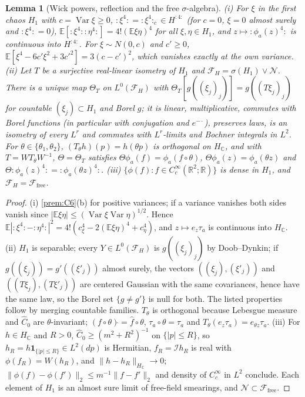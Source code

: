 \documentclass[11pt]{article}
\theoremstyle{plain}
\newtheorem{lemma}[theorem]{Lemma}
\theoremstyle{definition}
\theoremstyle{remark}
\newcommand{\R}{\mathbb{R}}
\newcommand{\C}{\mathbb{C}}
\newcommand{\E}{\mathbb{E}}
\newcommand{\cF}{\mathcal{F}}
\newcommand{\cI}{\mathcal{I}}
\newcommand{\cN}{\mathcal{N}}
\newcommand{\ind}{\mathbf{1}}
\DeclareMathOperator{\Var}{Var}
\begin{document}
\begin{lemma}[Wick powers, reflection and the free $\sigma$-algebra]\label{lem:W-prelim}
(i) For $\xi$ in the first chaos $H_1$ with $c=\Var\xi\ge0$, ${:}\xi^{4}{:}={:}\xi^{4}{:}_c\in H^{{:}4{:}}$ (for $c=0$,
$\xi=0$ almost surely and ${:}\xi^{4}{:}=0$), $\E[{:}\xi^{4}{:}{:}\eta^{4}{:}]=4!(\E\xi\eta)^{4}$ for all $\xi,\eta\in H_1$, and
$z\mapsto{:}\phi_a(z)^{4}{:}$ is continuous into $H^{{:}4{:}}$. For $\xi\sim N(0,c)$ and $c'\ge0$,
$\E[\xi^{4}-6c'\xi^{2}+3c'^{2}]=3(c-c')^{2}$, which vanishes exactly at the own variance.
(ii) Let $T$ be a surjective real-linear isometry of $H_1$ and $\cF_H=\sigma(H_1)\vee\cN$. There is a
unique map $\Theta_T$ on $L^{0}(\cF_H)$ with $\Theta_T[g((\xi_j)_j)]=g((T\xi_j)_j)$ for countable $(\xi_j)\subset H_1$ and
Borel $g$; it is linear, multiplicative, commutes with Borel functions (in
particular with conjugation and $e^{-\cdot}$), preserves laws, is an isometry of every
$L^{r}$ and commutes with $L^{r}$-limits and Bochner integrals in $L^{2}$. For
$\theta\in\{\theta_1,\theta_2\}$, $(T_\theta h)(p)=h(\theta p)$ is orthogonal on $H_\C$, and with $T=WT_\theta W^{-1}$,
$\Theta=\Theta_T$ satisfies $\Theta\phi_a(f)=\phi_a(f\circ\theta)$, $\Theta\phi_a(z)=\phi_a(\theta z)$ and
$\Theta{:}\phi_a(z)^{4}{:}={:}\phi_a(\theta z)^{4}{:}$.
(iii) $\{\phi(f):f\in C_c^{\infty}(\R^{2};\R)\}$ is dense in $H_1$, and $\cF_H=\cF_{\mathrm{free}}$.
\end{lemma}

\begin{proof}
(i) \ref{prem:C6}(b) for positive variances; if a variance vanishes both sides vanish
since $|\E\xi\eta|\le(\Var\xi\Var\eta)^{1/2}$. Hence $\E|{:}\xi^{4}{:}-{:}\eta^{4}{:}|^{2}=4!(c_\xi^{4}-2(\E\xi\eta)^{4}+c_\eta^{4})$, and
$z\mapsto e_z\tau_a$ is continuous into $H_\C$. (ii) $H_1$ is separable; every $Y\in L^{0}(\cF_H)$ is
$g((\xi_j)_j)$ by Doob--Dynkin; if $g((\xi_j))=g'((\xi'_j))$ almost surely, the vectors
$((\xi_j),(\xi'_j))$ and $((T\xi_j),(T\xi'_j))$ are centered Gaussian with the same covariances,
hence have the same law, so the Borel set $\{g\ne g'\}$ is null for both. The listed
properties follow by merging countable families. $T_\theta$ is orthogonal because
Lebesgue measure and $\hat C_0$ are $\theta$-invariant; $(f\circ\theta)\hat{}=\hat f\circ\theta$, $\tau_a\circ\theta=\tau_a$ and
$T_\theta(e_z\tau_a)=e_{\theta z}\tau_a$. (iii) For $h\in H_\C$ and $R>0$, $\hat C_0\ge(m^{2}+R^{2})^{-1}$ on $\{|p|\le R\}$, so
$h_R=h\ind_{\{|p|\le R\}}\in L^{2}(dp)$ is Hermitian, $f_R=\cI h_R$ is real with $\phi(f_R)=W(h_R)$, and
$\|h-h_R\|_{H_\C}\to0$; $\|\phi(f)-\phi(f')\|_2\le m^{-1}\|f-f'\|_2$ and density of $C_c^{\infty}$ in $L^{2}$ conclude.
Each element of $H_1$ is an almost sure limit of free-field smearings, and $\cN\subset\cF_{\mathrm{free}}$.
\end{proof}
\end{document}
